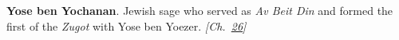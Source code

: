 \textbf{Yose ben Yochanan}. Jewish sage who served as \emph{Av Beit Din} and formed the first of the \emph{Zugot} with Yose ben Yoezer. \emph{[Ch.~\hyperref[ch:jewishcalendar]{26}]}

